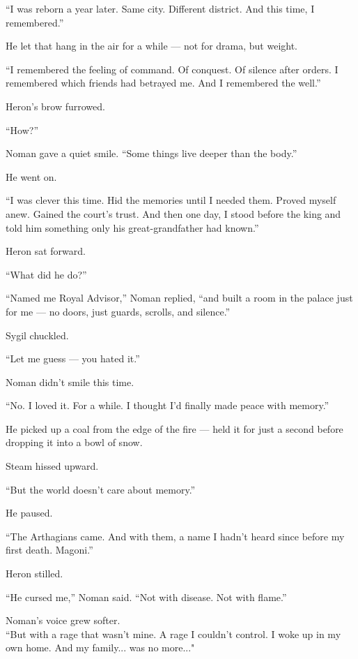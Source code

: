\documentclass[12pt]{article}
\begin{document}
“I was reborn a year later. Same city. Different district. And this time, I remembered.”

\vspace{1em}

He let that hang in the air for a while — not for drama, but weight.

“I remembered the feeling of command. Of conquest. Of silence after orders. I remembered which friends had betrayed me. And I remembered the well.”

Heron’s brow furrowed.

“How?”

Noman gave a quiet smile. “Some things live deeper than the body.”

\vspace{1em}

He went on.

“I was clever this time. Hid the memories until I needed them. Proved myself anew. Gained the court’s trust. And then one day, I stood before the king and told him something only his great-grandfather had known.”

Heron sat forward.

“What did he do?”

“Named me Royal Advisor,” Noman replied, “and built a room in the palace just for me — no doors, just guards, scrolls, and silence.”

Sygil chuckled.

“Let me guess — you hated it.”

Noman didn’t smile this time.

“No. I loved it. For a while. I thought I’d finally made peace with memory.”

He picked up a coal from the edge of the fire — held it for just a second before dropping it into a bowl of snow.

Steam hissed upward.

“But the world doesn’t care about memory.”

\vspace{1em}

He paused.

“The Arthagians came. And with them, a name I hadn’t heard since before my first death. Magoni.”

Heron stilled.

“He cursed me,” Noman said. “Not with disease. Not with flame.”

Noman’s voice grew softer.\\
“But with a rage that wasn’t mine. A rage I couldn’t control. I woke up in my own home. And my family... was no more..."
\end{document}

